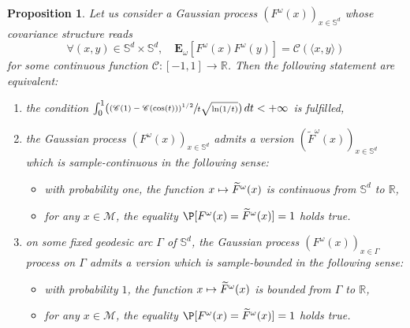 \documentclass[JEP,XML,SOM,Unicode,NoEqCountersInSection,published]{cedram}
\newcommand{\Psfrac}[2]{(\sfrac{#1}{#2})}
\def\mto{\mathchoice{\longmapsto}{\mapsto}{\mapsto}{\mapsto}}
\newenvironment{enumeratei}
{\bgroup\def\theenumi{\roman{enumi}}\def\theenumii{\arabic{enumii}}\begin{enumerate}}
{\end{enumerate}\egroup}
\theoremstyle{theorem}
\newtheorem{prop}[theo]{Proposition}
\theoremstyle{definition}
\newcommand\R{\mathbb{R}}
\newcommand\E{\mathbf{E}}
\newcommand\bbS{\mathbb{S}}
\begin{document}
\begin{prop}\label{casSd}
Let us consider a Gaussian process $(F^\omega(x))_{x\in \bbS^d}$ whose covariance structure reads
\begin{equation}\label{covSD}
\forall (x,y)\in \bbS^d\times \bbS^d, \quad \E_\omega[F^\omega(x) F^\omega(y)]=\mathscr{C}(\langle x, y\rangle)
\end{equation}
for some continuous function $\mathscr{C}:[-1,1]\to \R$. Then the following statement are equivalent:
\begin{enumeratei}
\item\label{casSdi} the condition $\int_{0}^{1} \Psfrac{(\mathscr{C}(1)-\mathscr{C}(\cos(t)))^{1/2}}{t\sqrt{\ln(1/t)}}\, dt<+\infty$ is fulfilled,
\item\label{casSdii} the Gaussian process $(F^\omega(x))_{x\in \bbS^d}$ admits a version $(\widetilde{F}^\omega(x))_{x\in \bbS^d}$ which is sample-continuous in the following sense:
\begin{itemize}
\item with probability one, the function $x\mto \widetilde{F}^{\omega}(x)$ is continuous from
$\bbS^d$ to $\R$,
\item for any $x\in \mathcal{M}$, the equality $\P[F^{\omega}(x)=\widetilde{F}^{\omega}(x)]=1$ holds true.
\end{itemize}
\item\label{casSdiii} on some fixed geodesic arc $\Gamma$ of $\bbS^d$, the Gaussian process $(F^\omega(x))_{x\in \Gamma}$ process on $\Gamma$ admits a version which is sample-bounded in the following sense:
\begin{itemize}
\item with probability $1$, the function $x \mto \widetilde{F}^{\omega}(x)$ is bounded from $\Gamma$ to $\R$,
\item for any $x\in \mathcal{M}$, the equality $\P[F^{\omega}(x)=\widetilde{F}^{\omega}(x)]=1$ holds true.
\end{itemize}
\end{enumeratei}
\end{prop}
\end{document}
